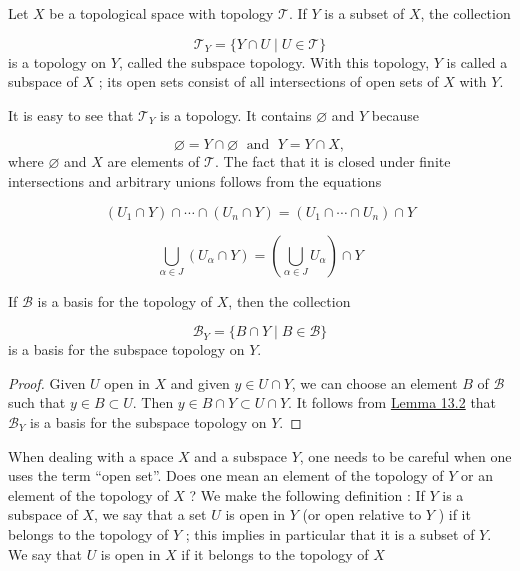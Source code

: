 
\begin{definition}
 Let \(X\) be a topological space with topology \(\mathcal{T}\). If \(Y\) is a subset of \(X\), the collection

 \[
 \mathcal{T}_{Y} = \{ Y \cap U \mid U \in \mathcal{T}\}
 \]
 is a topology on \(Y\), called the subspace topology. With this topology, \(Y\) is called a subspace of \(X\) ; its open sets consist of all intersections of open sets of \(X\) with \(Y\).
\end{definition}

It is easy to see that \(\mathcal{T}_{Y}\) is a topology. It contains \(\varnothing\) and \(Y\) because

\[
\varnothing = Y \cap \varnothing \;\text{ and }\;Y = Y \cap X,
\]
where \(\varnothing\) and \(X\) are elements of \(\mathcal{T}\). The fact that it is closed under finite intersections and arbitrary unions follows from the equations

\[
( {U_{1} \cap Y}) \cap \cdots \cap ( {U_{n} \cap Y}) = ( {U_{1} \cap \cdots \cap {U}_{n}}) \cap Y
\]

\[
\mathop{\bigcup }\limits_{{\alpha \in J}}( {U_{\alpha } \cap Y}) = ( {\mathop{\bigcup }\limits_{{\alpha \in J}}U_{\alpha }}) \cap Y
\]

\begin{lemma}
\label{lem:\thetheorem}
 If \(\mathcal{B}\) is a basis for the topology of \(X\), then the collection

 \[
 \mathcal{B}_{Y} = \{ B \cap Y \mid B \in \mathcal{B}\}
 \]
 is a basis for the subspace topology on \(Y\).
\end{lemma}

\begin{proof}
 Given \(U\) open in \(X\) and given \(y \in U \cap Y\), we can choose an element \(B\) of \(\mathcal{B}\) such that \(y \in B \subset U\). Then \(y \in B \cap Y \subset U \cap Y\). It follows from \hyperref[lem:13.2]{Lemma 13.2} that \(\mathcal{B}_{Y}\) is a basis for the subspace topology on \(Y\).
\end{proof}

When dealing with a space \(X\) and a subspace \(Y\), one needs to be careful when one uses the term ``open set''. Does one mean an element of the topology of \(Y\) or an element of the topology of \(X\) ? We make the following definition : If \(Y\) is a subspace of \(X\), we say that a set \(U\) is open in \(Y\) (or open relative to \(Y\) ) if it belongs to the topology of \(Y\) ; this implies in particular that it is a subset of \(Y\). We say that \(U\) is open in \(X\) if it belongs to the topology of \(X\)

